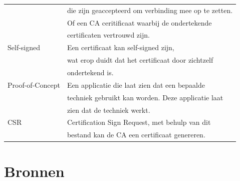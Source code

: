 \documentclass[]{article}
\begin{document}
\begin{longtable}{|| l | l ||}
                     & die zijn geaccepteerd om verbinding mee op te zetten.\\
                     & Of een CA ceritificaat waarbij de ondertekende       \\
                     & certificaten vertrouwd  zijn.                        \\\hline
    Self-signed      & Een certificaat kan self-signed zijn,                \\
                     & wat erop duidt dat het certificaat door zichtzelf    \\
                     & ondertekend is.                                      \\\hline
    Proof-of-Concept & Een applicatie die laat zien dat een bepaalde        \\
                     & techniek gebruikt kan worden. Deze applicatie laat   \\
                     & zien dat de techniek werkt.                   \\\hline
    CSR              & Certification Sign Request, met behulp van dit       \\
                     & bestand kan de CA een certificaat genereren.         \\\hline
\end{longtable}

\newpage
\section{Bronnen}
\end{document}
